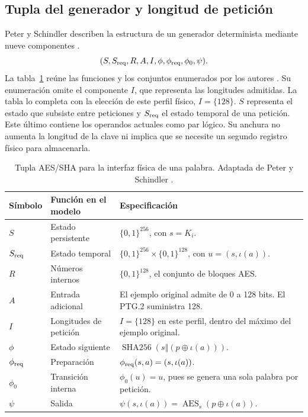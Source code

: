 \documentclass[11pt,a4paper]{article}
\newcommand{\Enc}{\operatorname{AES}}
\newcommand{\HH}{\operatorname{SHA256}}
\newcommand{\bits}{\{0,1\}}
\newcommand{\cat}{\mathbin\Vert}
\begin{document}
\subsection{Tupla del generador y longitud de petición}
Peter y Schindler describen la estructura de un generador determinista mediante nueve componentes \cite[párr.~129, ec.~(3.1)]{ais}.
\[
 (S,S_{\rm req},R,A,I,\phi,\phi_{\rm req},\phi_0,\psi).
\]
La tabla~\ref{tab:tupla} reúne las funciones y los conjuntos enumerados por los autores \cite[párr.~997, p.~203]{ais}. Su enumeración omite el componente \(I\), que representa las longitudes admitidas. La tabla lo completa con la elección de este perfil físico, \(I=\{128\}\). \(S\) representa el estado que subsiste entre peticiones y \(S_{\rm req}\) el estado temporal de una petición. Este último contiene los operandos actuales como par lógico. Su anchura no aumenta la longitud de la clave ni implica que se necesite un segundo registro físico para almacenarla.
\begin{table}[htbp]\centering\small
\caption{Tupla AES/SHA para la interfaz física de una palabra. Adaptada de Peter y Schindler \cite[párrs.~129 y 996--997]{ais}.}\label{tab:tupla}
\begin{tabularx}{\linewidth}{@{}l l X@{}}\toprule
Símbolo & Función en el modelo & Especificación\\\midrule
\(S\)& Estado persistente & \(\bits^{256}\), con \(s=K_i\).\\
\(S_{\rm req}\)& Estado temporal & \(\bits^{256}\times\bits^{128}\), con \(u=(s,\iota(a))\).\\
\(R\)& Números internos & \(\bits^{128}\), el conjunto de bloques AES.\\
\(A\)& Entrada adicional & El ejemplo original admite de 0 a 128 bits. El PTG.2 suministra 128.\\
\(I\)& Longitudes de petición & \(I=\{128\}\) en este perfil, dentro del máximo del ejemplo original.\\
\(\phi\)& Estado siguiente & \(\HH(s\cat(p\oplus\iota(a)))\).\\
\(\phi_{\rm req}\)& Preparación & \(\phi_{\rm req}(s,a)=(s,\iota(a))\).\\
\(\phi_0\)& Transición interna & \(\phi_0(u)=u\), pues se genera una sola palabra por petición.\\
\(\psi\)& Salida & \(\psi(s,\iota(a))=\Enc_s(p\oplus\iota(a))\).\\\bottomrule
\end{tabularx}
\end{table}
\end{document}
